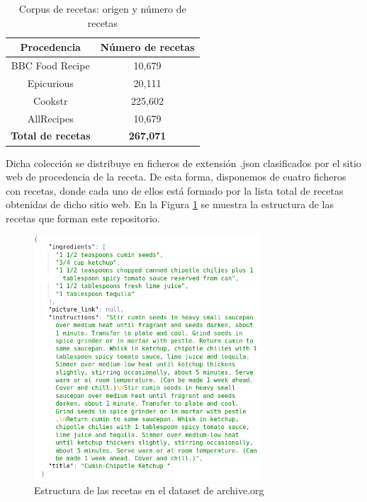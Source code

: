 \begin{table}[H]
\centering
\begin{center}
    {\caption{Corpus de recetas: origen y número de recetas} \label{table3}}
    \begin{tabular}{cc}
        \hline
        \textbf{Procedencia} & \textbf{Número de recetas} \\ \hline \hline
        BBC Food Recipe & 10,679 \\ \hline
        Epicurious & 20,111 \\ \hline
        Cookstr & 225,602 \\ \hline
        AllRecipes & 10,679 \\ \hline \hline
        \textbf{Total de recetas} & \textbf{267,071} \\ \hline
        \end{tabular}
\end{center}
\end{table}

Dicha colección se distribuye en ficheros de extensión .json clasificados por el sitio web de procedencia de la receta. De esta forma, disponemos de cuatro ficheros con recetas, donde cada uno de ellos está formado por la lista total de recetas obtenidas de dicho sitio web. En la Figura \ref{fig:estructura-recetas} se muestra la estructura de las recetas que forman este repositorio. 

\begin{figure}[H]
    \centering
    \includegraphics[width=0.75\textwidth]{imagenes/ejemplo-json-2.png}
    \caption{Estructura de las recetas en el dataset de archive.org}
    \label{fig:estructura-recetas}
\end{figure}

